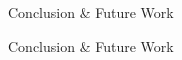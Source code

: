 \begin{frame}{Conclusion \& Future Work}
    \begin{center}
        \Huge Conclusion \& Future Work
    \end{center}
\end{frame}